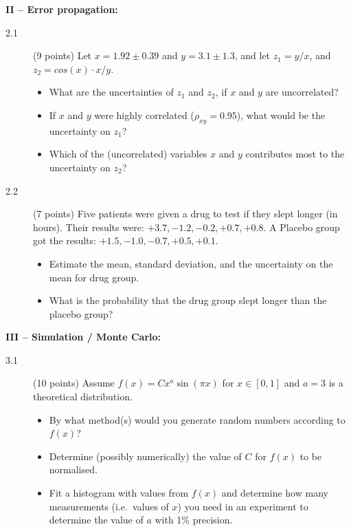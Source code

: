 \documentclass[11pt]{article}
\begin{document}

\vspace{2ex}
\noindent
{\bf II -- Error propagation:}
\begin{description}
\item[2.1] (9 points)
  Let $x = 1.92 \pm 0.39$ and $y = 3.1 \pm 1.3$, and let $z_1 = y/x$, and $z_2 = cos(x) \cdot x/y$.
  \vspace*{-1ex}
  \begin{itemize}
    \item What are the uncertainties of $z_1$ and $z_2$, if $x$ and $y$ are uncorrelated?
    \item If $x$ and $y$ were highly correlated ($\rho_{xy} = 0.95$), what would be the uncertainty on $z_1$?
    \item Which of the (uncorrelated) variables $x$ and $y$ contributes most to the uncertainty on $z_2$?
  \end{itemize}
%
  \item[2.2] (7 points)
    Five patients were given a drug to test if they slept longer (in hours). Their results were:
    $+3.7, -1.2 , -0.2 , +0.7, +0.8$. A Placebo group got the results: $+1.5, -1.0 , -0.7, +0.5, +0.1$.
  \vspace*{-1ex}
  \begin{itemize}
    \item Estimate the mean, standard deviation, and the uncertainty on the mean for drug group.
    \item What is the probability that the drug group slept longer than the placebo group?
  \end{itemize}
\end{description}



\newpage

\noindent
{\bf III -- Simulation / Monte Carlo:}
\begin{description}
  \item[3.1] (10 points)
    Assume $f(x) = C x^a \sin(\pi x)$ for $x \in [0,1]$ and $a=3$ is a theoretical distribution.
  \vspace*{-1ex}
  \begin{itemize}
    \item By what method(s) would you generate random numbers according to $f(x)$?
    \item Determine (possibly numerically) the value of $C$ for $f(x)$ to be normalised.
    \item Fit a histogram with values from $f(x)$ and determine how many measurements (i.e.\ values of $x$)
      you need in an experiment to determine the value of $a$ with 1\% precision.
  \end{itemize}
\end{description}
\end{document}
